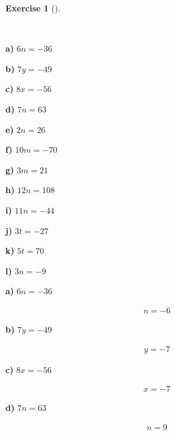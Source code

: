 \documentclass[
  letterpaper,
  DIV=11,
  numbers=noendperiod]{scrreprt}
\theoremstyle{definition}
\newtheorem{exercise}{Exercise}[chapter]
\theoremstyle{remark}
\begin{document}
\begin{exercise}[]\protect\hypertarget{exr-u5-2}{}\label{exr-u5-2}

~

\textbf{a)} \(\displaystyle 6n = -36\)

\textbf{b)} \(\displaystyle 7y = -49\)

\textbf{c)} \(\displaystyle 8x = -56\)

\textbf{d)} \(\displaystyle 7n = 63\)

\textbf{e)} \(\displaystyle 2n = 26\)

\textbf{f)} \(\displaystyle 10m = -70\)

\textbf{g)} \(\displaystyle 3m = 21\)

\textbf{h)} \(\displaystyle 12n = 108\)

\textbf{i)} \(\displaystyle 11n = -44\)

\textbf{j)} \(\displaystyle 3t = -27\)

\textbf{k)} \(\displaystyle 5t = 70\)

\textbf{l)} \(\displaystyle 3n = -9\)

\begin{tcolorbox}[enhanced jigsaw, opacitybacktitle=0.6, coltitle=black, arc=.35mm, colframe=quarto-callout-tip-color-frame, colback=white, bottomrule=.15mm, left=2mm, colbacktitle=quarto-callout-tip-color!10!white, titlerule=0mm, opacityback=0, title=\textcolor{quarto-callout-tip-color}{\faLightbulb}\hspace{0.5em}{🔍 View Solutions}, leftrule=.75mm, breakable, rightrule=.15mm, bottomtitle=1mm, toptitle=1mm, toprule=.15mm]

\textbf{a)} \(\displaystyle 6n = -36\)

\begin{align*}
n = -6
\end{align*}

\textbf{b)} \(\displaystyle 7y = -49\)

\begin{align*}
y = -7
\end{align*}

\textbf{c)} \(\displaystyle 8x = -56\)

\begin{align*}
x = -7
\end{align*}

\textbf{d)} \(\displaystyle 7n = 63\)

\begin{align*}
n = 9
\end{align*}


\end{tcolorbox}
\end{exercise}
\end{document}
